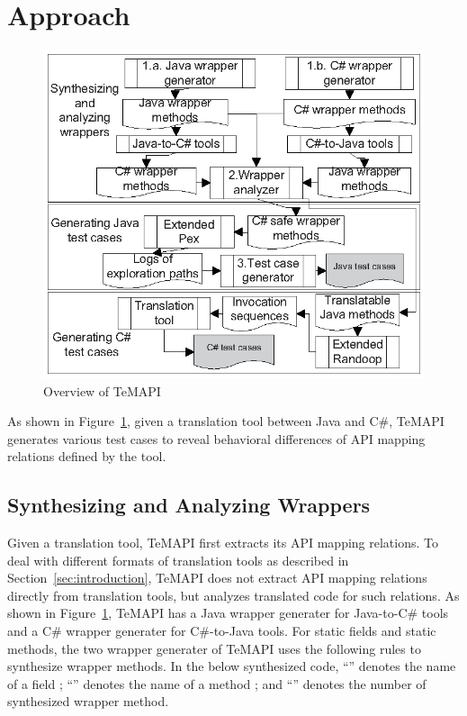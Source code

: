 \section{Approach}
\label{sec:approach}
\begin{figure}[t]
\centering
\includegraphics[scale=0.9,clip]{figure/approach.eps}\vspace*{-3ex}
 \caption{Overview of TeMAPI}\vspace*{-4ex}
 \label{fig:approach}
\end{figure}

As shown in Figure~\ref{fig:approach}, given a translation tool between Java and C\#, TeMAPI generates various test cases to reveal behavioral differences of API mapping relations defined by the tool.


\subsection{Synthesizing and Analyzing Wrappers}
\label{sec:approach:wrapper}
Given a translation tool, TeMAPI first extracts its API mapping relations. To deal with different formats of translation tools as described in Section~\ref{sec:introduction}, TeMAPI does not extract API mapping relations directly from translation tools, but analyzes translated code for such relations. As shown in Figure~\ref{fig:approach}, TeMAPI has a Java wrapper generater for Java-to-C\# tools and a C\# wrapper generater for C\#-to-Java tools. For static fields and static methods, the two wrapper generater of TeMAPI uses the following rules to synthesize wrapper methods. In the below synthesized code, ``'' denotes the name of a field ; ``'' denotes the name of a method ; and ``'' denotes the number of synthesized wrapper method.

